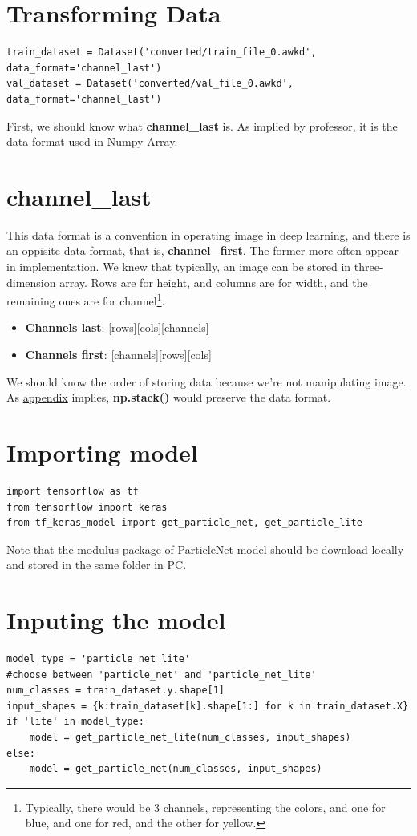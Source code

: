 \documentclass[12pt]{report}
\numberwithin{equation}{section}
\begin{document}
\section{Transforming Data}
\begin{lstlisting}
train_dataset = Dataset('converted/train_file_0.awkd', data_format='channel_last')
val_dataset = Dataset('converted/val_file_0.awkd', data_format='channel_last')
\end{lstlisting}
First, we should know what \textbf{channel\_last} is. As implied by professor, it is the data format used in Numpy Array.
\section{channel\_last}\label{sec::channel}
This data format is a convention in operating image in deep learning, and there is an oppisite data format, that is, \textbf{channel\_first}.
The former more often appear in implementation.
We knew that typically, an image can be stored in three-dimension array.
Rows are for height, and columns are for width, and the remaining ones are for channel\footnote{Typically, there would be 3 channels, representing the colors, and one for blue, and one for red, and the other for yellow.}.  
\begin{itemize}
    \item \textbf{Channels last}: [rows][cols][channels]
    \item \textbf{Channels first}: [channels][rows][cols]
\end{itemize}

We should know the order of storing data because we're not manipulating image.
As \hyperref[sec::Appendices]{appendix} implies, \textbf{np.stack()} would preserve the data format.

\section{Importing model}
\begin{lstlisting}
import tensorflow as tf 
from tensorflow import keras
from tf_keras_model import get_particle_net, get_particle_lite
\end{lstlisting}
Note that the modulus package of ParticleNet model should be download locally and stored in the same folder in PC.

\section{Inputing the model}
\begin{lstlisting}
model_type = 'particle_net_lite'
#choose between 'particle_net' and 'particle_net_lite'
num_classes = train_dataset.y.shape[1]
input_shapes = {k:train_dataset[k].shape[1:] for k in train_dataset.X}
if 'lite' in model_type:
    model = get_particle_net_lite(num_classes, input_shapes)
else:
    model = get_particle_net(num_classes, input_shapes)
\end{lstlisting}
\end{document}
